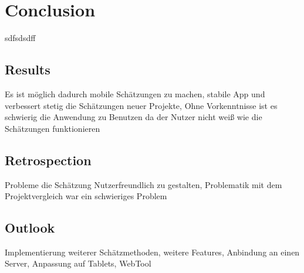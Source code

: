 \chapter{Conclusion}

sdfsdsdff


\section{Results}

Es ist möglich dadurch mobile Schätzungen zu machen, stabile App und verbessert stetig die Schätzungen neuer Projekte, Ohne Vorkenntnisse ist es schwierig die Anwendung zu Benutzen da der  Nutzer nicht weiß wie die Schätzungen funktionieren

\section{Retrospection}

Probleme die Schätzung Nutzerfreundlich zu gestalten, Problematik mit dem Projektvergleich war ein schwieriges Problem

\section{Outlook}

Implementierung weiterer Schätzmethoden, weitere Features, Anbindung an einen Server, Anpassung auf Tablets, WebTool